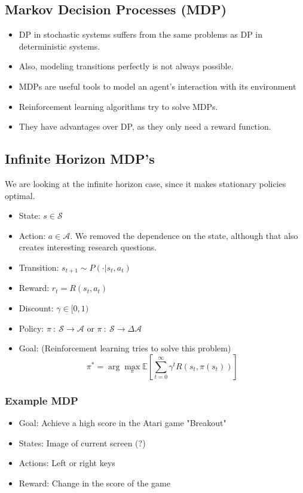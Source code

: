 \documentclass[10pt]{article}
\begin{document}
\subsection*{Markov Decision Processes (MDP)}
\begin{itemize}
	\item DP in stochastic systems suffers from the same problems as DP in deterministic systems.
	\item Also, modeling transitions perfectly is not always possible.
	\item MDPs are useful tools to model an agent's interaction with its environment
	\item Reinforcement learning algorithms try to solve MDPs.
	\item They have advantages over DP, as they only need a reward function.
\end{itemize}

\subsection*{Infinite Horizon MDP's}
We are looking at the infinite horizon case, since it makes stationary policies optimal.
\begin{itemize}
	\item State: $s \in \mathcal{S}$
	\item Action: $a \in \mathcal{A}$.  We removed the dependence on the state, although that also creates interesting research questions.
	\item Transition: $s_{t + 1} \sim P(\cdot | s_t, a_t)$
	\item Reward: $r_t = R(s_t, a_t)$
	\item Discount: $\gamma \in [0, 1)$
	\item Policy: $\pi \::\: \mathcal{S} \rightarrow \mathcal{A}$ or $\pi \::\: \mathcal{S} \rightarrow \Delta \mathcal{A}$
	\item Goal:  (Reinforcement learning tries to solve this problem)
	\[\pi^* = \arg \max_\pi \mathbb{E} \left[\sum_{t = 0}^\infty \gamma^t R(s_t, \pi(s_t))\right]\]
\end{itemize}

\subsubsection*{Example MDP}
\begin{itemize}
	\item Goal: Achieve a high score in the Atari game "Breakout"
	\item States: Image of current screen (?)
	\item Actions: Left or right keys
	\item Reward: Change in the score of the game
\end{itemize}
\end{document}
